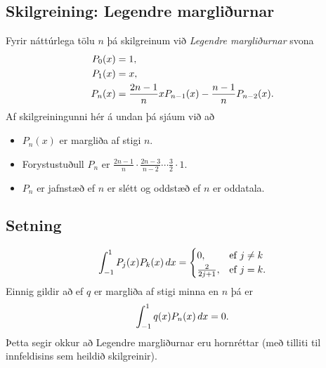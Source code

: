 \documentclass[letterpaper,10pt,icelandic]{sphinxmanual}
\begin{document}
\subsection{Skilgreining: Legendre margliðurnar}
\label{kafli03:skilgreining-legendre-margliurnar}\label{kafli03:index-17}
Fyrir náttúrlega tölu \(n\) þá skilgreinum við
\emph{Legendre margliðurnar} svona
\begin{gather}
\begin{split}\begin{aligned}
   P_0(x) &= 1,\\
   P_1(x) &= x,\\
   P_n(x) &= \frac{2n-1}n x P_{n-1}(x) - \frac{n-1}n P_{n-2}(x).
  \end{aligned}\end{split}\notag
\end{gather}
Af skilgreiningunni hér á undan þá sjáum við að
\begin{itemize}
\item {} 
\(P_n(x)\) er margliða af stigi \(n\).

\item {} 
Forystustuðull \(P_n\) er
\(\frac {2n-1}n \cdot \frac {2n-3}{n-2} \cdots \frac 32 \cdot 1\).

\item {} 
\(P_n\) er jafnstæð ef \(n\) er slétt og oddstæð ef \(n\)
er oddatala.

\end{itemize}


\subsection{Setning}
\label{kafli03:id5}\begin{gather}
\begin{split}\int_{-1}^1 P_j(x) P_k(x)\, dx =
    \begin{cases}
     0, & \text{ef } j\neq k\\
     \frac{2}{2j+1}, & \text{ef } j=k.
    \end{cases}\end{split}\notag
\end{gather}
Einnig gildir að ef \(q\) er margliða af stigi minna en \(n\) þá er
\begin{gather}
\begin{split}\int_{-1}^1 q(x)P_n(x)\, dx = 0.\end{split}\notag
\end{gather}
Þetta segir okkur að Legendre margliðurnar eru hornréttar (með tilliti
til innfeldisins sem heildið skilgreinir).
\end{document}

